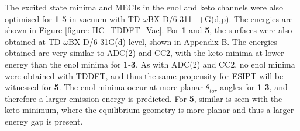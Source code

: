 The excited state minima and \ac{MECI}s in the enol and keto channels were also optimised for \textbf{1}-\textbf{5} in vacuum with TD-$\omega$BX-D/6-311++G(d,p). The energies are shown in Figure \ref{figure: HC_TDDFT_Vac}. For \textbf{1} and \textbf{5}, the surfaces were also obtained at TD-$\omega$BX-D/6-31G(d) level, shown in Appendix B. The energies obtained are very similar to ADC(2) and CC2, with the keto minima at lower energy than the enol minima for \textbf{1}-\textbf{3}. As with ADC(2) and CC2, no enol minima were obtained with TDDFT, and thus the same propensity for ESIPT will be witnessed for \textbf{5}. The enol minima occur at more planar $\theta_{tor}$ angles for \textbf{1}-\textbf{3}, and therefore a larger emission energy is predicted. For \textbf{5}, similar is seen with the keto minimum, where the equilibrium geometry is more planar and thus a larger energy gap is present.

